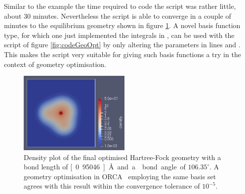 Similar to the \CCD example the time required to code the script
was rather little, about 30 minutes.
Nevertheless the script is able to converge
in a couple of minutes to the equilibrium geometry shown
in figure \ref{fig:OptimalGeometryWater}.
A novel basis function type,
for which one just implemented the \SCF integrals in \gint,
can be used with the script of figure \ref{fig:codeGeoOpt}
by only altering the parameters in lines \lgbasone and \lgbastwo.
This makes the script very suitable for giving such basis functions
a try in the context of geometry optimisation.

\begin{figure}
	\centering
	\includegraphics[width=0.48\textwidth]{h2o_density.png}
	\caption[Density plot of an optimised  molecule at Hartree-Fock level]
	{Density plot of the final optimised 
	Hartree-Fock geometry with a
	 bond length of \unit[0.95046]{\AA} and
	a  bond angle of $106.35^\circ$.
	A geometry optimisation in ORCA~\cite{ORCA}
	employing the same basis set
	agrees with this result within the convergence tolerance of $10^{-5}$.
	}
	\label{fig:OptimalGeometryWater}
\end{figure}
